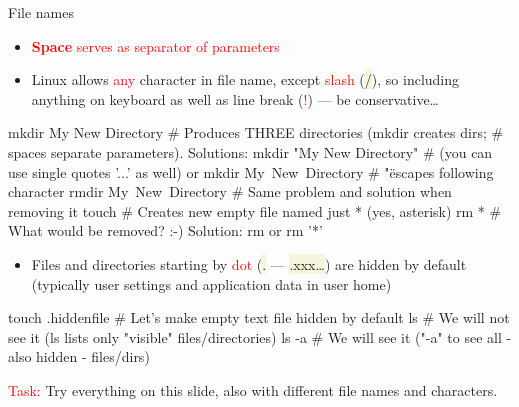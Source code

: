 \documentclass[compress, xelatex, 11pt, xcolor=svgnames, aspectratio=169, url={hyphens, lowtilde}]{beamer}
\renewcommand{\texttt}[1]{\colorbox{Beige}{{\ttfamily #1}}}
\renewcommand{\alert}[1]{\textcolor{red}{#1}}
\begin{document}
\begin{frame}[fragile]{File names}
	\label{filenames}
	\begin{itemize}
		\item \alert{\textbf{Space} serves as separator of parameters}
		\item Linux allows \alert{any} character in file name, except \alert{slash} (\texttt{/}), so including anything on keyboard as well as line break (\alert{!}) --- be conservative\ldots
	\end{itemize}
	\begin{bashcode}
    mkdir My New Directory # Produces THREE directories (mkdir creates dirs;
                           # spaces separate parameters). Solutions:
    mkdir "My New Directory" # (you can use single quotes '...' as well) or
    mkdir My\ New\ Directory # "\" escapes following character
    rmdir My\ New\ Directory # Same problem and solution when removing it
    touch \* # Creates new empty file named just * (yes, asterisk)
    rm * # What would be removed? :-) Solution: rm \* or rm '*'
	\end{bashcode}
	\begin{itemize}
		\item Files and directories starting by \alert{dot} (\texttt{.} --- \texttt{.xxx\ldots}) are hidden by default (typically user settings and application data in user home)
	\end{itemize}
	\begin{bashcode}
    touch .hiddenfile # Let's make empty text file hidden by default
    ls # We will not see it (ls lists only "visible" files/directories)
    ls -a # We will see it ("-a" to see all - also hidden - files/dirs)
	\end{bashcode}
	\alert{Task:} Try everything on this slide, also with different file names and characters.
\end{frame}
\end{document}
